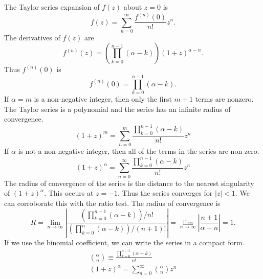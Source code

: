 {%
\begin{Solution}
  \label{solution taylor (1+z)^a}
  The Taylor series expansion of $f(z)$ about $z = 0$ is
  \[
  f(z) = \sum_{n = 0}^\infty \frac{f^{(n)}(0)}{n!} z^n.
  \]
  The derivatives of $f(z)$ are
  \[
  f^{(n)}(z) = \left( \prod_{k = 0}^{n-1} (\alpha - k) \right) (1 + z)^{\alpha-n}.
  \]
  Thus $f^{(n)}(0)$ is
  \[
  f^{(n)}(0) = \prod_{k = 0}^{n-1} (\alpha - k).
  \]
  If $\alpha = m$ is a non-negative integer, then only the first $m + 1$ terms
  are nonzero.  The Taylor series is a polynomial and the series has 
  an infinite radius of convergence.
  \[
  (1 + z)^m = \sum_{n = 0}^m \frac{ \prod_{k = 0}^{n-1} (\alpha - k) }{ n! } z^n
  \]
  If $\alpha$ is not a non-negative integer, then all of the terms in the 
  series are non-zero.
  \[
  (1 + z)^\alpha = \sum_{n = 0}^\infty \frac{ \prod_{k = 0}^{n-1} (\alpha - k) }{ n! } z^n
  \]
  The radius of convergence of the series is the distance to the nearest 
  singularity of $(1 + z)^\alpha$.  This occurs at $z = -1$.  Thus the 
  series converges for $|z| < 1$.  We can corroborate this with the 
  ratio test.  The radius of convergence is 
  \[
  R = \lim_{n \to \infty} \left| 
    \frac{ \left( \prod_{k = 0}^{n-1} (\alpha - k)\right) / n! }
    { \left( \prod_{k = 0}^n (\alpha - k) \right) / (n + 1)! } \right|
  = \lim_{n \to \infty} \left| \frac{ n + 1 }{ \alpha - n } \right|
  = 1.
  \]
  If we use the binomial coefficient,
  we can write the series in a compact form.
  \begin{gather*}
    \binom{\alpha}{n} \equiv \frac{ \prod_{k = 0}^{n-1} (\alpha - k) }{ n! }
    \\
    \boxed{
      (1 + z)^\alpha = \sum_{n = 0}^\infty \binom{\alpha}{n} z^n
      }
  \end{gather*}
\end{Solution}


}
